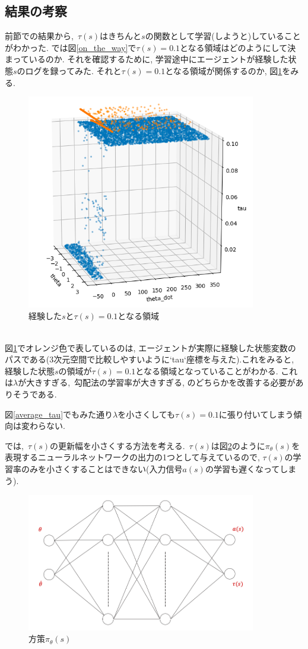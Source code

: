 \documentclass{jsarticle}
\begin{document}
\subsection{結果の考察}
前節での結果から,~$\tau(s)$はきちんと$s$の関数として学習(しようと)していることがわかった. では図\ref{on_the_way}で$\tau(s)=0.1$となる領域はどのようにして決まっているのか. それを確認するために, 学習途中にエージェントが経験した状態$s$のログを録ってみた. それと$\tau(s)=0.1$となる領域が関係するのか, 図\ref{state_log_and_tau}をみる.
\begin{figure}[h]
	\centering
 	\includegraphics[width=10cm]{state_log_and_tau.png}
 	\caption{経験した$s$と$\tau(s)=0.1$となる領域}  \label{state_log_and_tau}
\end{figure}\\
図\ref{state_log_and_tau}でオレンジ色で表しているのは, エージェントが実際に経験した状態変数のパスである(3次元空間で比較しやすいように`tau`座標を与えた).これをみると, 経験した状態$s$の領域が$\tau(s)=0.1$となる領域となっていることがわかる. これは$\lambda$が大きすぎる,~勾配法の学習率が大きすぎる, のどちらかを改善する必要がありそうである. \par
図\ref{average_tau}でもみた通り$\lambda$を小さくしても$\tau(s)=0.1$に張り付いてしまう傾向は変わらない.\par
では,~$\tau(s)$の更新幅を小さくする方法を考える.~$\tau(s)$は図\ref{actor_NN}のように$\pi_{\theta}(s)$を表現するニューラルネットワークの出力の1つとして与えているので, $\tau(s)$の学習率のみを小さくすることはできない(入力信号$a(s)$の学習も遅くなってしまう).
\begin{figure}[h]
	\centering
 	\includegraphics[width=10cm]{actor_NN.png}
 	\caption{方策$\pi_{\theta}(s)$}  \label{actor_NN}
\end{figure}\\
\end{document}
